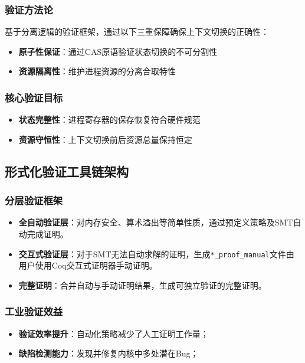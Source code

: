\subsubsection{验证方法论}
\noindent 基于分离逻辑的验证框架，通过以下三重保障确保上下文切换的正确性：
\begin{itemize}
    \item \textbf{原子性保证}：通过CAS原语验证状态切换的不可分割性
    \item \textbf{资源隔离性}：维护进程资源的分离合取特性
\end{itemize}

\subsubsection{核心验证目标}
\begin{itemize}
    \item \textbf{状态完整性}：进程寄存器的保存恢复符合硬件规范
    \item \textbf{资源守恒性}：上下文切换前后资源总量保持恒定
\end{itemize}

\subsection{形式化验证工具链架构}
\label{subsec:toolchain-arch}

\subsubsection{分层验证框架}
\begin{itemize}
    \item \textbf{全自动验证层}：对内存安全、算术溢出等简单性质，通过预定义策略及SMT自动完成证明。
    \item \textbf{交互式验证层}：对于SMT无法自动求解的证明，生成\texttt{*\_proof\_manual}文件由用户使用Coq交互式证明器手动证明。
    \item \textbf{完整证明}：合并自动与手动证明结果，生成可独立验证的完整证明。
\end{itemize}

\subsubsection{工业验证效益}
\begin{itemize}
    \item \textbf{验证效率提升}：自动化策略减少了人工证明工作量；
    \item \textbf{缺陷检测能力}：发现并修复内核中多处潜在Bug；
\end{itemize}

